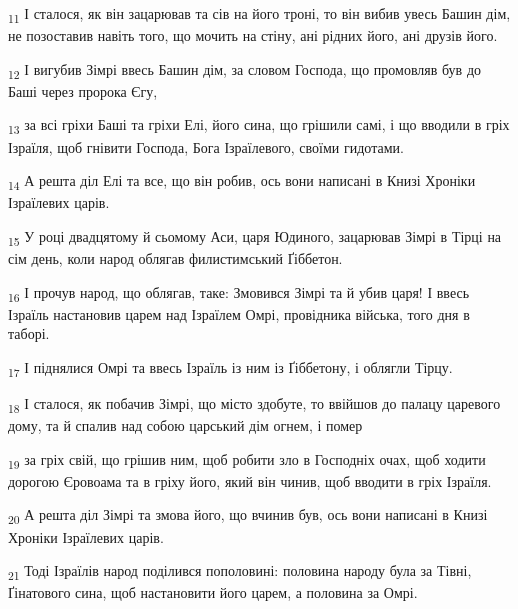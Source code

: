 \begin{tcolorbox}
\textsubscript{11} І сталося, як він зацарював та сів на його троні, то він вибив увесь Башин дім, не позоставив навіть того, що мочить на стіну, ані рідних його, ані друзів його.
\end{tcolorbox}
\begin{tcolorbox}
\textsubscript{12} І вигубив Зімрі ввесь Башин дім, за словом Господа, що промовляв був до Баші через пророка Єгу,
\end{tcolorbox}
\begin{tcolorbox}
\textsubscript{13} за всі гріхи Баші та гріхи Елі, його сина, що грішили самі, і що вводили в гріх Ізраїля, щоб гнівити Господа, Бога Ізраїлевого, своїми гидотами.
\end{tcolorbox}
\begin{tcolorbox}
\textsubscript{14} А решта діл Елі та все, що він робив, ось вони написані в Книзі Хроніки Ізраїлевих царів.
\end{tcolorbox}
\begin{tcolorbox}
\textsubscript{15} У році двадцятому й сьомому Аси, царя Юдиного, зацарював Зімрі в Тірці на сім день, коли народ облягав филистимський Ґіббетон.
\end{tcolorbox}
\begin{tcolorbox}
\textsubscript{16} І прочув народ, що облягав, таке: Змовився Зімрі та й убив царя! І ввесь Ізраїль настановив царем над Ізраїлем Омрі, провідника війська, того дня в таборі.
\end{tcolorbox}
\begin{tcolorbox}
\textsubscript{17} І піднялися Омрі та ввесь Ізраїль із ним із Ґіббетону, і облягли Тірцу.
\end{tcolorbox}
\begin{tcolorbox}
\textsubscript{18} І сталося, як побачив Зімрі, що місто здобуте, то ввійшов до палацу царевого дому, та й спалив над собою царський дім огнем, і помер
\end{tcolorbox}
\begin{tcolorbox}
\textsubscript{19} за гріх свій, що грішив ним, щоб робити зло в Господніх очах, щоб ходити дорогою Єровоама та в гріху його, який він чинив, щоб вводити в гріх Ізраїля.
\end{tcolorbox}
\begin{tcolorbox}
\textsubscript{20} А решта діл Зімрі та змова його, що вчинив був, ось вони написані в Книзі Хроніки Ізраїлевих царів.
\end{tcolorbox}
\begin{tcolorbox}
\textsubscript{21} Тоді Ізраїлів народ поділився пополовині: половина народу була за Тівні, Ґінатового сина, щоб настановити його царем, а половина за Омрі.
\end{tcolorbox}
